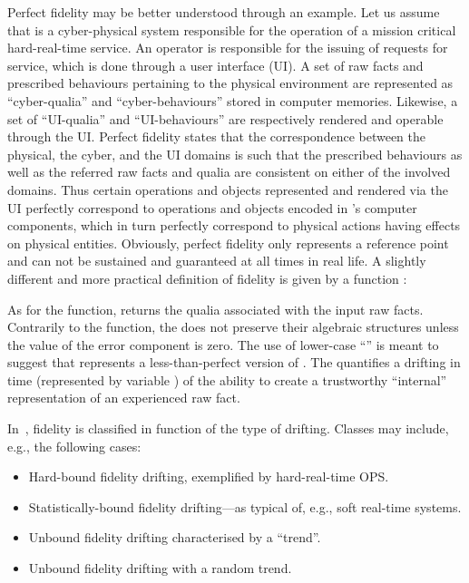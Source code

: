 \documentclass{article}
\begin{document}
Perfect fidelity may be better understood through an example. Let us assume that  is a cyber-physical system responsible for the operation of a mission critical hard-real-time service. An operator is responsible for the issuing of requests for service, which is done through a user interface (UI). A set of raw facts and prescribed behaviours pertaining to the physical environment are represented as ``cyber-qualia'' and ``cyber-behaviours'' stored in computer memories. Likewise, a set of ``UI-qualia'' and ``UI-behaviours'' are respectively rendered and operable through the UI. Perfect fidelity states that the correspondence between the physical, the cyber, and the UI domains is such that the prescribed behaviours as well as the referred raw facts and qualia are consistent on either of the involved domains. Thus certain operations and objects represented and rendered via the UI perfectly correspond to operations and objects encoded in 's computer components, which in turn perfectly correspond to physical actions having effects on physical entities. Obviously, perfect fidelity only represents a reference point and can not be sustained and guaranteed at all times in real life. A slightly different and more practical definition of fidelity is given by a function :


As for the  function,  returns the qualia associated with the input raw facts. Contrarily to the  function, the  does not preserve
their algebraic structures unless the value of the error component  is zero. The use of lower-case
``'' is meant to suggest that  represents a less-than-perfect version of .  The  quantifies a drifting in time (represented
by variable ) of the ability to create a trustworthy ``internal'' representation of an experienced raw fact.

In~\cite{DF14a}, fidelity is classified in function of the type of drifting. Classes may include, e.g., the following cases:

\begin{itemize}
\item Hard-bound fidelity drifting, exemplified by hard-real-time OPS.
\item Statistically-bound fidelity drifting---as typical of, e.g., soft real-time systems.
\item Unbound fidelity drifting characterised by a ``trend''.
\item Unbound fidelity drifting with a random trend.
\end{itemize}
\end{document}

